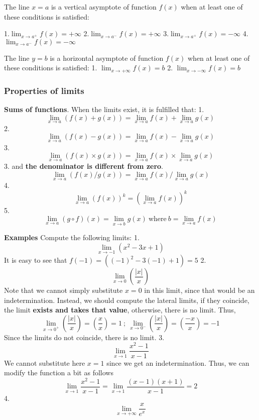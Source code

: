 \documentclass[11pt]{article}
\begin{document}
The line \(x = a\) is a vertical asymptote of function \(f(x)\) when at
least one of these conditions is satisfied:

1.\(\lim_{x\rightarrow a^+}f(x) = +\infty\)
2.\(\lim_{x\rightarrow a^-}f(x) = +\infty\)
3.\(\lim_{x\rightarrow a^+}f(x) = -\infty\)
4.\(\lim_{x\rightarrow a^-}f(x) = -\infty\)

The line \(y = b\) is a horizontal asymptote of function \(f(x)\) when
at least one of these conditions is satisfied: 1.
\(\lim_{x\rightarrow +\infty} f(x) = b\) 2.
\(\lim_{x\rightarrow -\infty} f(x) = b\)

\hypertarget{properties-of-limits}{%
\subsubsection{Properties of limits}\label{properties-of-limits}}

\textbf{Sums of functions}. When the limits exist, it is fulfilled that:
1.
\[\lim_{x\rightarrow a}\left(f(x) + g(x)\right) = \lim_{x\rightarrow a} f(x) + \lim_{x\rightarrow a} g(x)\]
2.
\[\lim_{x\rightarrow a}\left(f(x) - g(x)\right) = \lim_{x\rightarrow a} f(x) - \lim_{x\rightarrow a} g(x)\]
3.
\[\lim_{x\rightarrow a}\left(f(x) \times g(x)\right) = \lim_{x\rightarrow a} f(x) \times \lim_{x\rightarrow a} g(x)\]
3. and \textbf{the denominator is different from zero}.
\[\lim_{x\rightarrow a}\left(f(x) / g(x)\right) = \lim_{x\rightarrow a} f(x) / \lim_{x\rightarrow a} g(x)\]
4.
\[\lim_{x\rightarrow a}\left(f(x)\right)^k = \left(\lim_{x\rightarrow a} f(x)\right)^k\]
5.
\[\lim_{x\rightarrow a}\left(g\circ f\right)(x) = \lim_{x\rightarrow b} g(x) \ \text{where} \ b = \lim_{x\rightarrow a}f(x)\]

\textbf{Examples} Compute the following limits: 1.
\[\lim_{x\rightarrow -1} \left(x^2-3x +1\right)\] It is easy to see that
\(f(-1) = \left((-1)^2-3(-1) +1\right) = 5\) 2.
\[\lim_{x\rightarrow 0} \left(\frac{\lvert x \rvert}{x}\right)\] Note
that we cannot simply substitute \(x=0\) in this limit, since that would
be an indetermination. Instead, we should compute the lateral limits, if
they coincide, the limit \textbf{exists and takes that value},
otherwise, there is no limit. Thus, \[
\lim_{x\rightarrow 0^+} \left(\frac{\lvert x \rvert}{x}\right) = \left(\frac{x}{x}\right) = 1 \ ; \ \lim_{x\rightarrow 0^-} \left(\frac{\lvert x \rvert}{x}\right) = \left(\frac{-x}{x}\right) = -1
\] Since the limits do not coincide, there is no limit. 3.
\[\lim_{x\rightarrow 1} \frac{x^2-1}{x-1}\] We cannot substitute here
\(x = 1\) since we get an indetermination. Thus, we can modify the
function a bit as follows \[
\lim_{x\rightarrow 1} \frac{x^2-1}{x-1} = \lim_{x\rightarrow 1} \frac{(x-1)(x+1)}{x-1} = 2
\] 4. \[\lim_{x\rightarrow +\infty}\frac{x}{e^x}\]
\end{document}
